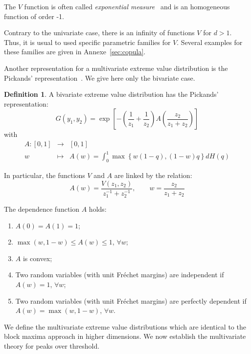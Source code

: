 \documentclass[11pt,a4paper]{article}
\numberwithin{equation}{section}
\theoremstyle{definition}
\newtheorem{defi}{Definition}[subsection]
\begin{document}
The $V$ function is often called \emph{exponential
  measure}~\citep{Kluppelberg2006} and is an homogeneous function of
order -1.

Contrary to the univariate case, there is an infinity of functions $V$
for $d>1$. Thus, it is usual to used specific parametric families for
$V$. Several examples for these families are given in
Annexe~\ref{sec:copula}.

Another representation for a multivariate extreme value distribution
is the Pickands' representation~\citep{Pickands1981}. We give here
only the bivariate case.

\begin{defi}
  A bivariate extreme value distribution has the Pickands' representation:
  \begin{equation}
    \label{eq:pickDepRep}
    G\left(y_1, y_2 \right) = \exp\left[- \left(\frac{1}{z_1} +
        \frac{1}{z_2} \right) A\left( \frac{z_2}{z_1+z_2} \right)
    \right]
  \end{equation}
  with
  \begin{eqnarray*}
    A : \left[0, 1 \right] &\longrightarrow& \left[0, 1 \right]\\
    w &\longmapsto& A(w) = \int_0^1 \max\left\{w\left(1-q\right),
      \left(1-w \right)q \right\} dH(q)
  \end{eqnarray*}
\end{defi}

In particular, the functions $V$ and $A$ are linked by the relation:
\begin{displaymath}
  A(w) = \frac{V\left(z_1,z_2\right)}{z_1^{-1} + z_2^{-1}},
  \qquad w = \frac{z_2}{z_1 + z_2}
\end{displaymath}

The dependence function $A$ holds:
\begin{enumerate}
\item $A(0) = A(1) = 1$;
\item $\max(w, 1 -w) \leq A(w) \leq 1$, $\forall w$;
\item $A$ is convex;
\item Two random variables (with unit Fr\'echet margins) are
  independent if $A(w)=1$, $\forall w$; 
\item Two random variables (with unit Fr\'echet margins) are
  perfectly dependent if $A(w)=\max(w,1-w)$, $\forall w$. 
\end{enumerate}

We define the multivariate extreme value distributions which are
identical to the block maxima approach in higher dimensions. We now
establish the multivariate theory for peaks over threshold.
\end{document}
